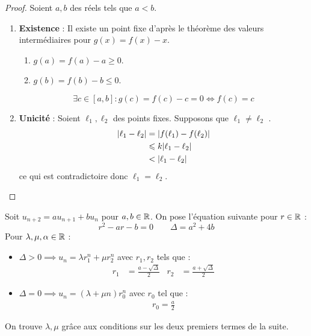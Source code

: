 \begin{proof}
	Soient $a, b$ des réels tels que $a < b$.
	\begin{enumerate}
		\item \textbf{Existence} : Il existe un point fixe d'après le théorème des valeurs intermédiaires pour $g(x) = f(x) - x$.
		\begin{enumerate}
			\item $g(a) = f(a) - a \geq 0$.
			\item $g(b) = f(b) - b \leq 0$.
		\end{enumerate}
		\[ \exists c \in [a, b] : g(c) = f(c) - c = 0 \iff f(c) = c \]
		\item \textbf{Unicité} : Soient $\ell_1, \ell_2$ des points fixes.
		Supposons que $\ell_1 \neq \ell_2$ .
		\begin{align*}
			\abs{\ell_1 - \ell_2} &= \abs{f(\ell_1) - f(\ell_2)} \\
								  &\leqslant k \abs{\ell_1 - \ell_2} \\
								  &< \abs{\ell_1 - \ell_2}
		\end{align*}
		ce qui est contradictoire donc $\ell_1 = \ell_2$.
	\end{enumerate}
\end{proof}

\begin{theorem}
	Soit $u_{n+2} = a u_{n+1} + b u_n$ pour $a, b \in \mathbb{R}$.
	On pose l'équation suivante pour $r \in \mathbb{R}$ :
	\[ r^2 - ar - b = 0 \qquad \Delta = a^2 + 4b \]
	Pour $\lambda, \mu, \alpha \in \mathbb{R}$ :
	\begin{itemize}
        \item $\Delta > 0 \implies u_n = \lambda r_1^n + \mu r_2^n$ avec $r_1, r_2$ tels que :
        \begin{align*}
            r_1 &= \frac{a - \sqrt{\Delta}}{2} & r_2 &= \frac{a + \sqrt{\Delta}}{2}
        \end{align*}
        \item $\Delta = 0 \implies u_n = (\lambda + \mu n) r_0^n$ avec $r_0$ tel que :
        \begin{align*}
            r_0 = \frac{a}{2}
        \end{align*}
    \end{itemize}    
    On trouve $\lambda, \mu$ grâce aux conditions sur les deux premiers termes de la suite.
\end{theorem}


